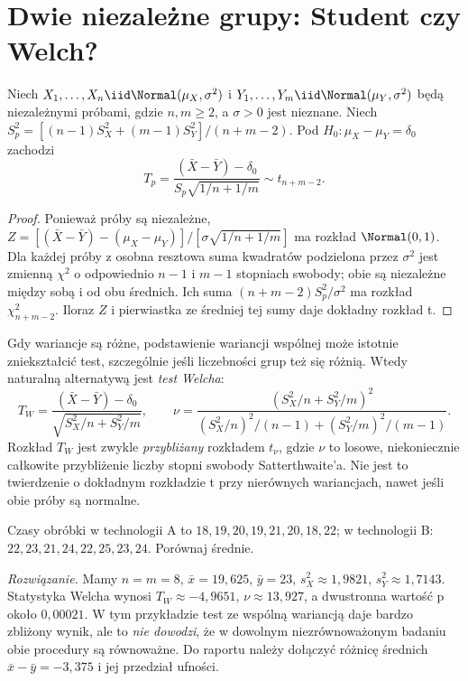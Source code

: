 \section{Dwie niezależne grupy: Student czy Welch?}
\begin{twierdzenie}
\label{thm:two-sample-t}
Niech $X_1,\ldots,X_n\iid\Normal(\mu_X,\sigma^2)$ i
$Y_1,\ldots,Y_m\iid\Normal(\mu_Y,\sigma^2)$ będą niezależnymi
próbami, gdzie $n,m\ge2$, a $\sigma>0$ jest nieznane.
Niech
$S_p^2=[(n-1)S_X^2+(m-1)S_Y^2]/(n+m-2)$.
Pod $H_0:\mu_X-\mu_Y=\delta_0$ zachodzi
\[
 T_p=\frac{(\bar X-\bar Y)-\delta_0}
 {S_p\sqrt{1/n+1/m}}\sim t_{n+m-2}.
\]
\end{twierdzenie}
\begin{proof}
Ponieważ próby są niezależne,
$Z=[(\bar X-\bar Y)-(\mu_X-\mu_Y)]/
[\sigma\sqrt{1/n+1/m}]$ ma rozkład $\Normal(0,1)$.
Dla każdej próby z osobna resztowa suma kwadratów podzielona
przez $\sigma^2$ jest zmienną $\chi^2$ o odpowiednio
$n-1$ i $m-1$ stopniach swobody; obie są niezależne
między sobą i od obu średnich. Ich suma
$(n+m-2)S_p^2/\sigma^2$ ma rozkład
$\chi^2_{n+m-2}$. Iloraz $Z$ i pierwiastka ze
średniej tej sumy daje dokładny rozkład t.
\end{proof}

Gdy wariancje są różne, podstawienie wariancji wspólnej
może istotnie zniekształcić test, szczególnie jeśli
liczebności grup też się różnią. Wtedy naturalną alternatywą
jest \emph{test Welcha}:
\[
 T_W=\frac{(\bar X-\bar Y)-\delta_0}
 {\sqrt{S_X^2/n+S_Y^2/m}},\qquad
 \nu=\frac{(S_X^2/n+S_Y^2/m)^2}
 {(S_X^2/n)^2/(n-1)+(S_Y^2/m)^2/(m-1)}.
\]
Rozkład $T_W$ jest zwykle \emph{przybliżany} rozkładem
$t_\nu$, gdzie $\nu$ to losowe, niekoniecznie całkowite
przybliżenie liczby stopni swobody Satterthwaite'a.
Nie jest to twierdzenie o dokładnym rozkładzie t przy
nierównych wariancjach, nawet jeśli obie próby są normalne.

\begin{zadanie}\label{zad:welch-case}
Czasy obróbki w technologii A to
$18,19,20,19,21,20,18,22$; w technologii B:
$22,23,21,24,22,25,23,24$. Porównaj średnie.
\par\emph{Rozwiązanie.} Mamy $n=m=8$,
$\bar x=19{,}625$, $\bar y=23$, $s_X^2\approx1{,}9821$,
$s_Y^2\approx1{,}7143$. Statystyka Welcha wynosi
$T_W\approx-4{,}9651$, $\nu\approx13{,}927$,
a dwustronna wartość p około $0{,}00021$.
W tym przykładzie test ze wspólną wariancją daje bardzo
zbliżony wynik, ale to \emph{nie dowodzi}, że w dowolnym
niezrównoważonym badaniu obie procedury są równoważne.
Do raportu należy dołączyć różnicę średnich
$\bar x-\bar y=-3{,}375$ i jej przedział ufności.
\end{zadanie}

